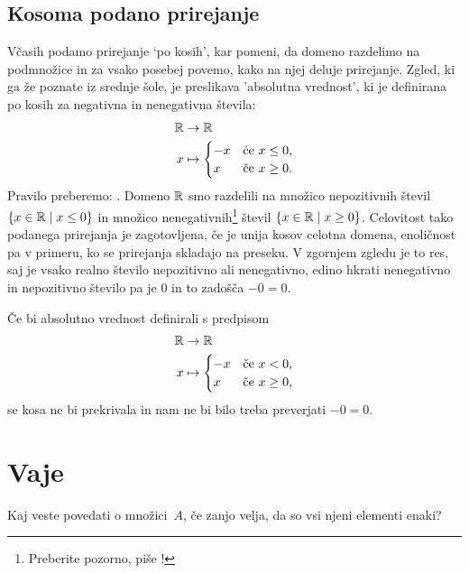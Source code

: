 \subsection{Kosoma podano prirejanje}

Včasih podamo prirejanje `po kosih', kar pomeni, da domeno razdelimo na podmnožice in za vsako posebej povemo, kako na njej deluje prirejanje.
%
Zgled, ki ga že poznate iz srednje šole, je preslikava 'absolutna vrednost', ki je definirana po kosih za negativna in nenegativna števila:
% 
\begin{align*}
  \mathbb{R} &\to \mathbb{R} \\
  x &\mapsto
      \begin{cases}
        -x & \text{če $x \leq 0$,}\\
        x & \text{če $x \geq 0$.}
      \end{cases}
\end{align*}
% 
Pravilo preberemo: .
%
Domeno $\mathbb{R}$ smo razdelili na množico nepozitivnih števil $\left\{x \in \mathbb{R} \; \middle| \; x \leq 0\right\}$ in množico nenegativnih\footnote{Preberite pozorno, piše !} števil $\left\{x \in \mathbb{R} \; \middle| \; x \geq 0\right\}$.
%
Celovitost tako podanega prirejanja je zagotovljena, če je unija kosov celotna domena,
enoličnost pa v primeru, ko se prirejanja skladajo na preseku.
%
V zgornjem zgledu je to res, saj je vsako realno število nepozitivno ali nenegativno, edino hkrati nenegativno in nepozitivno število pa je $0$ in to zadošča $-0 = 0$.

Če bi absolutno vrednost definirali s predpisom
%
\begin{align*}
  \mathbb{R} &\to \mathbb{R} \\
  x &\mapsto
      \begin{cases}
        -x & \text{če $x < 0$,}\\
        x & \text{če $x \geq 0$,}
      \end{cases}
\end{align*}
%
se kosa ne bi prekrivala in nam ne bi bilo treba preverjati $-0 = 0$.



\section{Vaje}

\begin{vaja}
Kaj veste povedati o množici~$A$, če zanjo velja, da so vsi njeni elementi enaki?
\end{vaja}


